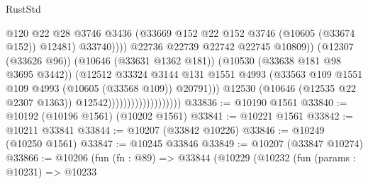 \begin{lexlean}{RustStd}
\begin{coremodule}
                                                        @120
                                                        @22
                                                        @28
                                                        @3746
                                                        @3436
                                                        (@33669
                                                          @152
                                                          @22
                                                          @152
                                                          @3746
                                                          (@10605 (@33674 @152))
                                                          @12481)
                                                        @33740))))
                                                @22736
                                                @22739
                                                @22742
                                                @22745
                                                @10809))
                                            (@12307 (@33626 @96))
                                            (@10646 (@33631 @1362 @181))
                                            (@10530 (@33638 @181 @98 @3695 @3442))
                                            (@12512
                                              @33324
                                              @3144
                                              @131
                                              @1551
                                              @4993
                                              (@33563
                                                @109
                                                @1551
                                                @109
                                                @4993
                                                (@10605 (@33568 @109))
                                                @20791)))
                                          @12530
                                          (@10646 (@12535 @22 @2307 @1363))
                                          @12542)))))))))))))))))))
@33836 := @10190 @1561
@33840 := @10192 (@10196 @1561) (@10202 @1561)
@33841 := @10221 @1561
@33842 := @10211 @33841
@33844 := @10207 (@33842 @10226)
@33846 := @10249 (@10250 @1561)
@33847 := @10245 @33846
@33849 := @10207 (@33847 @10274)
@33866 := @10206
    (fun (fn : @89) =>
    @33844
      (@10229
        (@10232
          (fun (params : @10231) =>
          @10233

\end{coremodule}
\end{lexlean}
